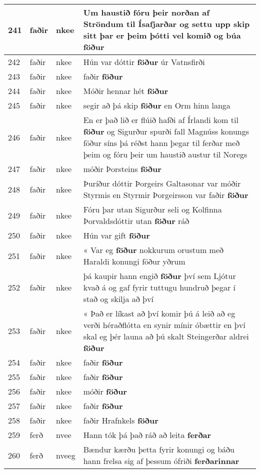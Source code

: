 \documentclass{article}
\begin{document}
\begin{longtable}{p{1cm}|p{1cm}|p{1cm}|p{13cm}}
\hline
241&faðir&nkee&Um haustið fóru þeir norðan af Ströndum til Ísafjarðar og settu upp skip sitt þar er þeim þótti vel komið og búa \textbf{föður} \\
\hline
242&faðir&nkee&Hún var dóttir \textbf{föður} úr Vatnsfirði\\
\hline
243&faðir&nkee&faðir \textbf{föður} \\
\hline
244&faðir&nkee&Móðir hennar hét \textbf{föður} \\
\hline
245&faðir&nkee&segir að þá skip \textbf{föður} en Orm hinn langa\\
\hline
246&faðir&nkee&En er það lið er flúið hafði af Írlandi kom til \textbf{föður} og Sigurður spurði fall Magnúss konungs föður síns þá réðst hann þegar til ferðar með þeim og fóru þeir um haustið austur til Noregs\\
\hline
247&faðir&nkee&móðir Þorsteins \textbf{föður} \\
\hline
248&faðir&nkee&Þuríður dóttir Þorgeirs Galtasonar var móðir Styrmis en Styrmir Þorgeirsson var faðir \textbf{föður} \\
\hline
249&faðir&nkee&Fóru þar utan Sigurður seli og Kolfinna Þorvaldsdóttir utan \textbf{föður} ráð\\
\hline
250&faðir&nkee&Hún var gift \textbf{föður} \\
\hline
251&faðir&nkee&« Var eg \textbf{föður} nokkurum orustum með Haraldi konungi föður yðrum\\
\hline
252&faðir&nkee&þá kaupir hann engið \textbf{föður} því sem Ljótur kvað á og gaf fyrir tuttugu hundruð þegar í stað og skilja að því\\
\hline
253&faðir&nkee&« Það er líkast að því komir þú á leið að eg verði héraðflótta en synir mínir óbættir en því skal eg þér launa að þú skalt Steingerðar aldrei \textbf{föður} \\
\hline
254&faðir&nkee&faðir \textbf{föður} \\
\hline
255&faðir&nkee&faðir \textbf{föður} \\
\hline
256&faðir&nkee&móðir \textbf{föður} \\
\hline
257&faðir&nkee&faðir \textbf{föður} \\
\hline
258&faðir&nkee&faðir Hrafnkels \textbf{föður} \\
\hline
259&ferð&nvee&Hann tók þá það ráð að leita \textbf{ferðar} \\
\hline
260&ferð&nveeg&Bændur kærðu þetta fyrir konungi og báðu hann frelsa sig af þessum ófriði \textbf{ferðarinnar} \\

\end{longtable}
\end{document}

